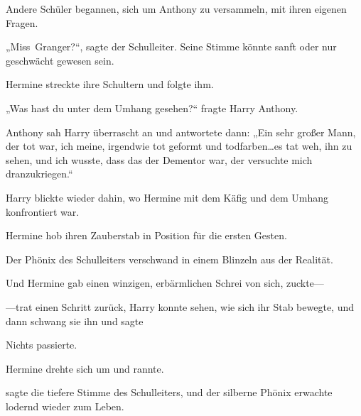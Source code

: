 Andere Schüler begannen, sich um Anthony zu versammeln, mit ihren eigenen Fragen.

„Miss~Granger?“, sagte der Schulleiter. Seine Stimme könnte sanft oder nur geschwächt gewesen sein.

Hermine streckte ihre Schultern und folgte ihm.

„Was hast du unter dem Umhang gesehen?“ fragte Harry Anthony.

Anthony sah Harry überrascht an und antwortete dann: „Ein sehr großer Mann, der tot war, ich meine, irgendwie tot geformt und todfarben…es tat weh, ihn zu sehen, und ich wusste, dass das der Dementor war, der versuchte mich dranzukriegen.“

Harry blickte wieder dahin, wo Hermine mit dem Käfig und dem Umhang konfrontiert war.

Hermine hob ihren Zauberstab in Position für die ersten Gesten.

Der Phönix des Schulleiters verschwand in einem Blinzeln aus der Realität.

Und Hermine gab einen winzigen, erbärmlichen Schrei von sich, zuckte—

—trat einen Schritt zurück, Harry konnte sehen, wie sich ihr Stab bewegte, und dann schwang sie ihn und sagte 

Nichts passierte.

Hermine drehte sich um und rannte.

 sagte die tiefere Stimme des Schulleiters, und der silberne Phönix erwachte lodernd wieder zum Leben.

